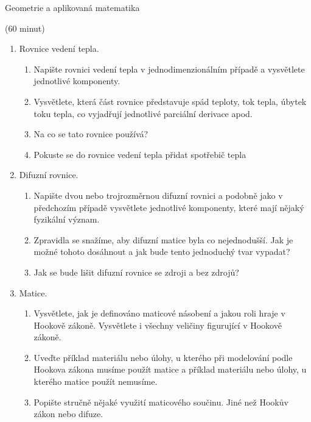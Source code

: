 \documentclass[12pt]{article}
\begin{document}
\begin{center}
  Geometrie a aplikovaná matematika

  (60 minut)  
\end{center}

\begin{enumerate}

\item Rovnice vedení tepla.
  \begin{enumerate}
  \item Napište rovnici vedení tepla v jednodimenzionálním případě a
  vysvětlete jednotlivé komponenty. 
\item Vysvětlete, která část rovnice
  představuje spád teploty, tok tepla, úbytek toku tepla, co vyjadřují
  jednotlivé parciální derivace apod.
\item Na co se tato rovnice používá?
\item Pokuste se do rovnice vedení tepla přidat spotřebič tepla
\end{enumerate}
  
\item Difuzní rovnice.
  \begin{enumerate}
  \item Napište dvou nebo trojrozměrnou difuzní rovnici a podobně jako
    v předchozím případě vysvětlete jednotlivé komponenty, které mají
    nějaký fyzikální význam. 
  \item Zpravidla se snažíme, aby difuzní matice
    byla co nejednodušší. Jak je možné tohoto dosáhnout a jak bude
    tento jednoduchý tvar vypadat?
  \item Jak se bude lišit difuzní rovnice se zdroji a bez zdrojů?
\end{enumerate}
  

\item Matice.
  \begin{enumerate}
  \item Vysvětlete, jak je definováno maticové násobení a jakou roli
    hraje v Hookově zákoně. Vysvětlete i všechny veličiny figurující v
    Hookově zákoně.
  \item Uveďte příklad materiálu nebo úlohy, u kterého při modelování
    podle Hookova zákona musíme použít matice a příklad materiálu nebo
    úlohy, u kterého matice použít nemusíme.
  \item Popište stručně nějaké využití maticového součinu. Jiné než
    Hookův zákon nebo difuze.
\end{enumerate}



\end{enumerate}
\end{document}
